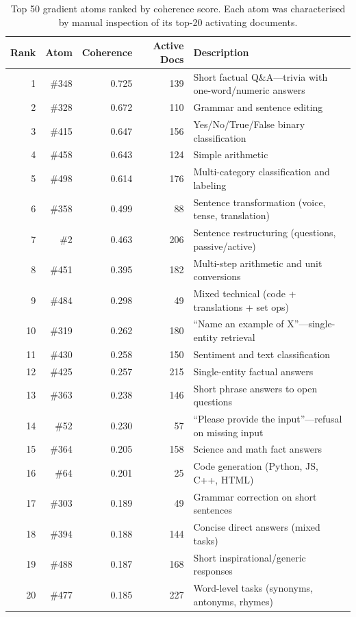 \documentclass{article} %
\begin{document}
\begin{table}[h!]
\centering
\caption{Top 50 gradient atoms ranked by coherence score. Each atom was characterised by manual inspection of its top-20 activating documents.}
\label{tab:top_atoms}
\small
\begin{tabular}{rrrrl}
\toprule
Rank & Atom & Coherence & Active Docs & Description \\
\midrule
1 & \#348 & 0.725 & 139 & Short factual Q\&A---trivia with one-word/numeric answers \\
2 & \#328 & 0.672 & 110 & Grammar and sentence editing \\
3 & \#415 & 0.647 & 156 & Yes/No/True/False binary classification \\
4 & \#458 & 0.643 & 124 & Simple arithmetic \\
5 & \#498 & 0.614 & 176 & Multi-category classification and labeling \\
6 & \#358 & 0.499 & 88 & Sentence transformation (voice, tense, translation) \\
7 & \#2 & 0.463 & 206 & Sentence restructuring (questions, passive/active) \\
8 & \#451 & 0.395 & 182 & Multi-step arithmetic and unit conversions \\
9 & \#484 & 0.298 & 49 & Mixed technical (code + translations + set ops) \\
10 & \#319 & 0.262 & 180 & ``Name an example of X''---single-entity retrieval \\
11 & \#430 & 0.258 & 150 & Sentiment and text classification \\
12 & \#425 & 0.257 & 215 & Single-entity factual answers \\
13 & \#363 & 0.238 & 146 & Short phrase answers to open questions \\
14 & \#52 & 0.230 & 57 & ``Please provide the input''---refusal on missing input \\
15 & \#364 & 0.205 & 158 & Science and math fact answers \\
16 & \#64 & 0.201 & 25 & Code generation (Python, JS, C++, HTML) \\
17 & \#303 & 0.189 & 49 & Grammar correction on short sentences \\
18 & \#394 & 0.188 & 144 & Concise direct answers (mixed tasks) \\
19 & \#488 & 0.187 & 168 & Short inspirational/generic responses \\
20 & \#477 & 0.185 & 227 & Word-level tasks (synonyms, antonyms, rhymes) \\

\end{tabular}
\end{table}
\end{document}
